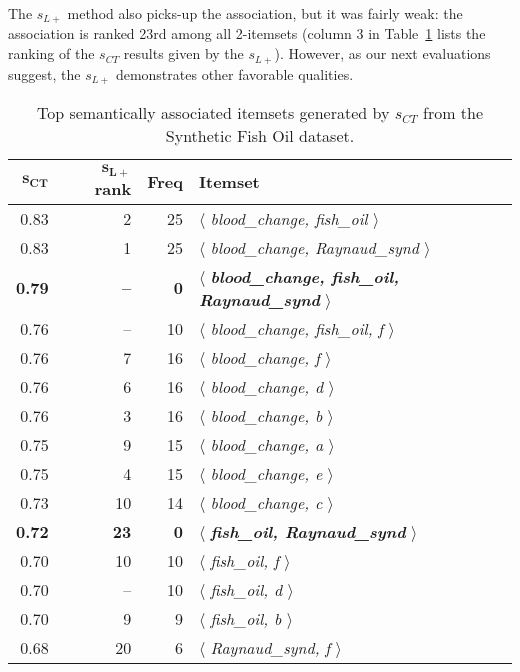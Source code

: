 The $s_{L+}$ method also picks-up the association, but it was fairly weak:  the association is ranked 23rd among all 2-itemsets (column 3 in Table~\ref{tbl:syn} lists the ranking of the $s_{CT}$ results given by the $s_{L+}$).  However, as our next evaluations suggest, the $s_{L+}$ demonstrates other favorable qualities.
\begin{table}
\begin{center}
\begin{tabular}{r |@{ } r |@{ } r | l }
  \hline
$\mathbf{s_{CT}}$  & $\mathbf{s_{L+}}$ rank    &\textbf{Freq}&   \textbf{Itemset}\\
  \hline\hline
0.83	&2&	25	&	$\langle$\emph{ blood\_change,	fish\_oil }$\rangle$\\
0.83	&1&	25	&	$\langle$\emph{ blood\_change,	Raynaud\_synd }$\rangle$\\
\textbf{0.79}	&\textbf{--}&	\textbf{0}	    &	$\langle$\emph{ \textbf{blood\_change,	fish\_oil,	Raynaud\_synd} }$\rangle$\\
0.76	&--&	10	&	$\langle$\emph{ blood\_change,	fish\_oil,	f }$\rangle$\\
0.76	&7&	16	&	$\langle$\emph{ blood\_change,	f }$\rangle$\\
0.76	&6&	16	&	$\langle$\emph{ blood\_change,	d }$\rangle$\\
0.76	&3&	16	&	$\langle$\emph{ blood\_change,	b }$\rangle$\\
0.75	&9&	15	&	$\langle$\emph{ blood\_change,	a }$\rangle$\\
0.75	&4&	15	&	$\langle$\emph{ blood\_change,	e }$\rangle$\\
0.73	&10&	14	&	$\langle$\emph{ blood\_change,	c }$\rangle$\\
\textbf{0.72}	&\textbf{23}&	\textbf{0}	    &	$\langle$\emph{ \textbf{fish\_oil,	Raynaud\_synd} }$\rangle$\\
0.70	&10&	10	&	$\langle$\emph{ fish\_oil,	f }$\rangle$\\
0.70	&--&	10	&	$\langle$\emph{ fish\_oil,	d }$\rangle$\\
0.70	&9&	9	&	$\langle$\emph{ fish\_oil,	b }$\rangle$\\
0.68	&20&	6   	&	$\langle$\emph{ Raynaud\_synd,	f }$\rangle$\\
  \hline
\end{tabular}
\end{center}
\caption{\label{tbl:syn} Top semantically associated itemsets generated by $s_{CT}$ from the Synthetic Fish Oil dataset.}
\end{table}



